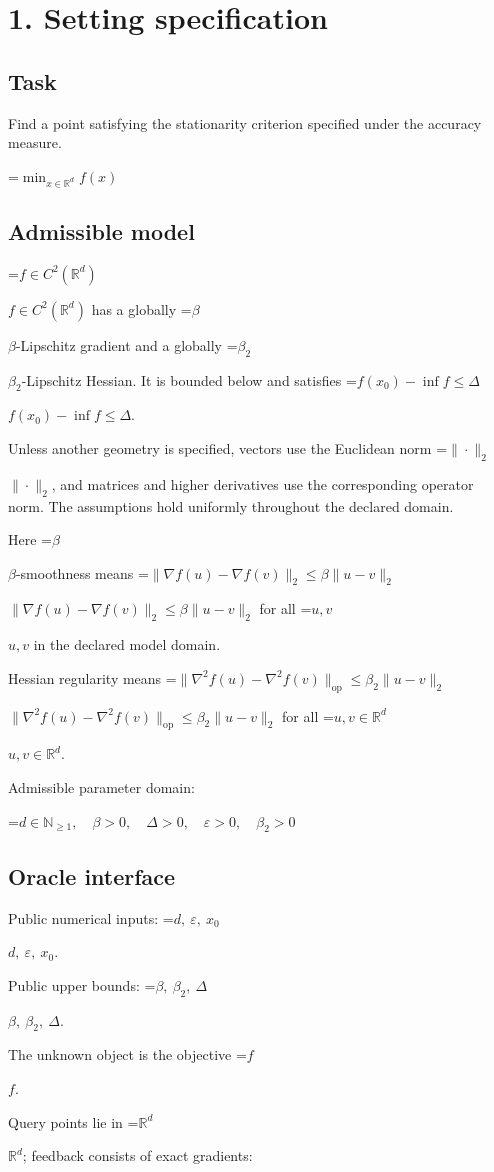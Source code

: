 \documentclass[10pt,a4paper]{article}
\newcommand{\AtlasMath}[1]{\par\begingroup\centering\setbox0=\hbox{$\displaystyle #1$}\ifdim\wd0>1.4\linewidth\typeout{ATLAS WIDE FORMULA: \the\wd0}\fi\ifdim\wd0>\linewidth\resizebox{\linewidth}{!}{\box0}\else\box0\fi\par\endgroup}
\newcommand{\AtlasInlineMath}[1]{\begingroup\setbox0=\hbox{$#1$}\ifdim\wd0>.4\linewidth\endgroup\AtlasMath{#1}\else\endgroup$#1$\fi}
\begin{document}
\section{1. Setting specification}
\subsection{Task}
Find a point satisfying the stationarity criterion specified under the accuracy measure.


\AtlasMath{\min_{x\in \mathbb{R}^d}f(x)}


\subsection{Admissible model}
\AtlasInlineMath{f\in C^2(\mathbb R^d)} has a globally \AtlasInlineMath{\beta}-Lipschitz gradient and a globally \AtlasInlineMath{\beta_2}-Lipschitz Hessian. It is bounded below and satisfies \AtlasInlineMath{f(x_0)-\inf f\le\Delta}.

Unless another geometry is specified, vectors use the Euclidean norm \AtlasInlineMath{\|\cdot\|_2}, and matrices and higher derivatives use the corresponding operator norm. The assumptions hold uniformly throughout the declared domain.

Here \AtlasInlineMath{\beta}-smoothness means \AtlasInlineMath{\|\nabla f(u)-\nabla f(v)\|_2\le\beta\|u-v\|_2} for all \AtlasInlineMath{u,v} in the declared model domain.

Hessian regularity means \AtlasInlineMath{\|\nabla^2 f(u)-\nabla^2 f(v)\|_{\mathrm{op}}\le\beta_2\|u-v\|_2} for all \AtlasInlineMath{u,v\in\mathbb R^d}.

Admissible parameter domain:


\AtlasMath{d\in\mathbb{N}_{\ge1},\quad \beta>0,\quad \Delta>0,\quad \varepsilon>0,\quad \beta_2>0}


\subsection{Oracle interface}
Public numerical inputs: \AtlasInlineMath{d,\ \varepsilon,\ x_0}.

Public upper bounds: \AtlasInlineMath{\beta,\ \beta_2,\ \Delta}.

The unknown object is the objective \AtlasInlineMath{f}.

Query points lie in \AtlasInlineMath{\mathbb{R}^d}; feedback consists of exact gradients:
\end{document}
